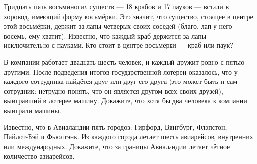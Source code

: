 ﻿
\begin{enumerate}
\itA Тридцать пять восьминогих существ — 18 крабов и 17 пауков — встали в хоровод, имеющий форму восьмёрки. Это значит, что существо, стоящее в центре этой восьмёрки, держит за лапы четверых своих соседей (благо, лап у него восемь, ему хватит). Известно, что каждый краб держится за лапы исключительно с пауками. Кто стоит в центре восьмёрки --- краб или паук?

\itB В компании работает двадцать шесть человек, и каждый дружит ровно с пятью другими. После подведения итогов государственной лотереи оказалось, что у каждого сотрудника найдётся друг или друг его друга (это может быть и сам сотрудник: нетрудно понять, что он является другом всех своих друзей), выигравший в лотерее машину. Докажите, что хотя бы два человека в компании выиграли машины.

\itC Известно, что в Авиаландии пять городов: Гирфорд, Вингбург, Флэпстон, Пайлот-Бэй и Фьюлтэнк. Из каждого города летает шесть авиарейсов, внутренних или международных. Докажите, что за границы Авиаландии летает чётное количество авиарейсов.
\end{enumerate}